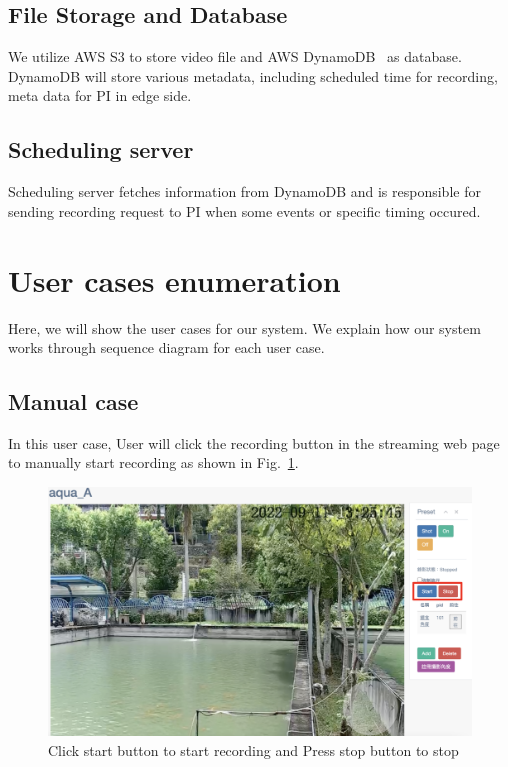 \subsection{File Storage and Database}
We utilize AWS S3 to store video file and AWS DynamoDB~\cite{aws-dynamodb} as database. DynamoDB will store various metadata, including scheduled time for recording, meta data for PI in edge side.

\subsection{Scheduling server}
Scheduling server fetches information from DynamoDB and is responsible for sending recording request to PI when some events or specific timing occured.


\section{User cases enumeration}
Here, we will show the user cases for our system. We explain how our system works through sequence diagram for each user case.
\subsection{Manual case}
In this user case, User will click the recording button in the streaming web page to manually start recording as shown in Fig.~\ref{fig:manual-case}. 


\begin{figure}[H]
    \centering
    \includegraphics[width=\textwidth]{figsrc/manual-case.png}
    \caption{Click start button to start recording and Press stop button to stop\label{fig:manual-case}}
\end{figure}

